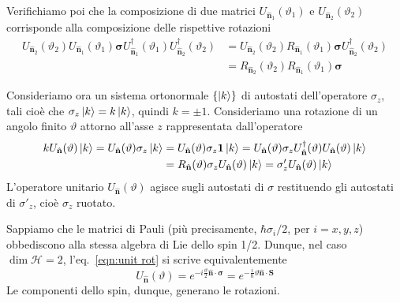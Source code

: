 Verifichiamo poi che la composizione di due matrici $U_{\hat{\textbf{n}}_1}(\vartheta_1)$ e $U_{\hat{\textbf{n}}_2}(\vartheta_2)$ corrisponde alla composizione delle rispettive rotazioni
\begin{equation} \begin{split}
U_{\hat{\textbf{n}}_2}(\vartheta_2) U_{\hat{\textbf{n}}_1}(\vartheta_1) \boldsymbol\sigma U_{\hat{\textbf{n}}_1}^\dagger(\vartheta_1) U_{\hat{\textbf{n}}_2}^\dagger(\vartheta_2)
&= U_{\hat{\textbf{n}}_2}(\vartheta_2) R_{\hat{\textbf{n}}_1}(\vartheta_1)\boldsymbol\sigma U_{\hat{\textbf{n}}_2}^\dagger(\vartheta_2)  \\
&= R_{\hat{\textbf{n}}_2}(\vartheta_2)R_{\hat{\textbf{n}}_1}(\vartheta_1)\boldsymbol\sigma
\end{split} \end{equation}

Consideriamo ora un sistema ortonormale $\left\{ \ket{k} \right\} $ di autostati dell'operatore $\sigma_z$, tali cioè che $\sigma_z\ket{k}=k\ket{k}$, quindi $k=\pm1$.  
Consideriamo una rotazione di un angolo finito $\vartheta$ attorno all'asse $z$ rappresentata dall'operatore 
\begin{equation} \begin{split}
kU_{\hat{\textbf{n}}}(\vartheta)\ket{k}=U_{\hat{\textbf{n}}}(\vartheta)\sigma_z\ket{k}
&=U_{\hat{\textbf{n}}}(\vartheta)\sigma_z\textbf{1}\ket{k}
=U_{\hat{\textbf{n}}}(\vartheta)\sigma_z U_{\hat{\textbf{n}}}^\dagger(\vartheta) U_{\hat{\textbf{n}}}(\vartheta)\ket{k} \\
&=R_{\hat{\textbf{n}}}(\vartheta)\sigma_z U_{\hat{\textbf{n}}}(\vartheta)\ket{k}=\sigma'_z U_{\hat{\textbf{n}}}(\vartheta)\ket{k}
\end{split} \end{equation}
L'operatore unitario $U_{\hat{\textbf{n}}}(\vartheta)$ agisce sugli autostati di $\sigma$ restituendo gli autostati di $\sigma'_z$, cioè $\sigma_z$ ruotato.

\medskip
Sappiamo che le matrici di Pauli (più precisamente, $\hbar\sigma_i/2$, per $i=x,y,z$) obbediscono alla stessa algebra di Lie dello spin 1/2. Dunque, nel caso $\dim\mathcal{H}=2$, l'eq.~\eqref{eqn:unit rot} si scrive equivalentemente
\begin{equation}
U_{\hat{\textbf{n}}}(\vartheta)=e^{-i\frac{\vartheta}{2}\hat{\textbf{n}}\cdot\boldsymbol\sigma}=e^{-\frac{i}{\hbar}\vartheta\hat{\textbf{n}}\cdot\textbf{S}}
\end{equation}
Le componenti dello spin, dunque, generano le rotazioni.

